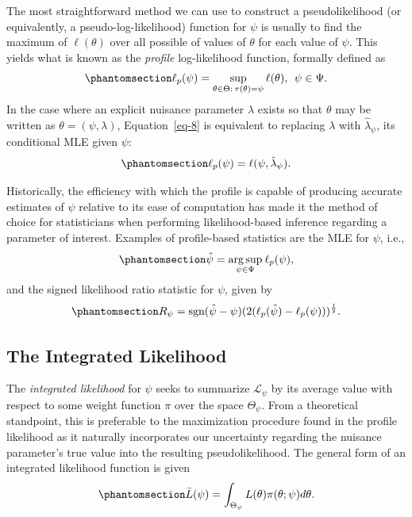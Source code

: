 \documentclass[
  12pt]{article}
\begin{document}
The most straightforward method we can use to construct a
pseudolikelihood (or equivalently, a pseudo-log-likelihood) function for
\(\psi\) is usually to find the maximum of \(\ell(\theta)\) over all
possible of values of \(\theta\) for each value of \(\psi\). This yields
what is known as the \emph{profile} log-likelihood function, formally
defined as \begin{equation}\phantomsection\label{eq-8}{
\ell_p(\psi) = \sup_{\theta \in \Theta: \> \tau(\theta) = \psi} \ell(\theta), \> \> \psi \in \Psi.
}\end{equation} In the case where an explicit nuisance parameter
\(\lambda\) exists so that \(\theta\) may be written as
\(\theta = (\psi, \lambda)\), Equation~\ref{eq-8} is equivalent to
replacing \(\lambda\) with \(\hat{\lambda}_{\psi}\), its conditional MLE
given \(\psi\): \begin{equation}\phantomsection\label{eq-9}{
\ell_p(\psi) = \ell(\psi, \hat{\lambda}_{\psi}).
}\end{equation}

Historically, the efficiency with which the profile is capable of
producing accurate estimates of \(\psi\) relative to its ease of
computation has made it the method of choice for statisticians when
performing likelihood-based inference regarding a parameter of interest.
Examples of profile-based statistics are the MLE for \(\psi\), i.e.,
\begin{equation}\phantomsection\label{eq-10}{
\hat{\psi} = \underset{\psi \in \Psi}{\arg\sup} \> \ell_p(\psi),
}\end{equation} and the signed likelihood ratio statistic for \(\psi\),
given by \begin{equation}\phantomsection\label{eq-10}{
R_{\psi} = \text{sgn}(\hat{\psi} - \psi)(2(\ell_p(\hat{\psi}) - \ell_p(\psi)))^{\frac{1}{2}}.
}\end{equation}

\subsection{The Integrated Likelihood}\label{the-integrated-likelihood}

The \emph{integrated likelihood} for \(\psi\) seeks to summarize
\(\mathcal{L}_{\psi}\) by its average value with respect to some weight
function \(\pi\) over the space \(\Theta_{\psi}\). From a theoretical
standpoint, this is preferable to the maximization procedure found in
the profile likelihood as it naturally incorporates our uncertainty
regarding the nuisance parameter's true value into the resulting
pseudolikelihood. The general form of an integrated likelihood function
is given \begin{equation}\phantomsection\label{eq-11}{
\bar{L}(\psi) = \int_{\Theta_{\psi}}L(\theta)\pi(\theta; \psi)d\theta.
}\end{equation}
\end{document}
